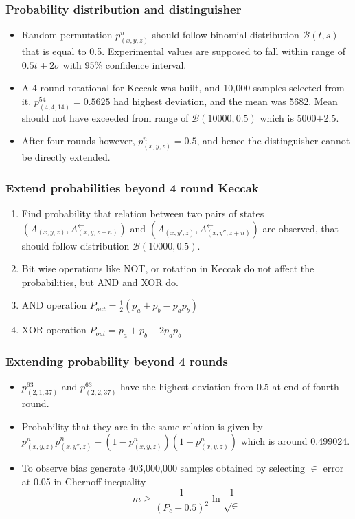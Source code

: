 \documentclass{beamer}
\begin{document}
\begin{frame}
\frametitle{Probability distribution and distinguisher}
\begin{itemize}
\item Random permutation $p^n_{(x, y, z)}$ should follow binomial distribution $\mathcal{B}(t, s)$ that is equal
to 0.5. Experimental values are supposed to fall within range of $0.5t\pm2\sigma$ with 95\% confidence interval.
\item A 4 round rotational for Keccak was built, and 10,000 samples selected from it. $p^{54}_{(4, 4, 14)} = 0.5625$
had highest deviation, and the mean was 5682. Mean should not have exceeded from range of 
$\mathcal{B}(10000, 0.5)$ which is 5000$\pm$2.5.
\item After four rounds however, $p^n_{(x, y, z)} = 0.5$, and hence the distinguisher cannot be directly extended.
\end{itemize}
\end{frame}

\begin{frame}
\frametitle{Extend probabilities beyond 4 round Keccak}
\begin{enumerate}
\item Find probability that relation between two pairs of states $(A_{(x, y, z)}, A^{\leftarrow}_{(x, y, z+n)})$ 
and $(A_{(x, y', z)}, A^{\leftarrow}_{(x, y'', z+n)})$ are observed, that should follow distribution 
$\mathcal{B}(10000, 0.5)$.
\item Bit wise operations like NOT, or rotation in Keccak do not affect the probabilities, but AND and XOR do.
\item AND operation $P_{out} = \frac{1}{2}(p_{a} + p_{b} - p_{a} p_{b})$ \footnotemark
\item XOR operation $P_{out} = p_{a} + p_{b} - 2 p_{a} p_{b}$
\end{enumerate}
\end{frame}

\begin{frame}
\frametitle{Extending probability beyond 4 rounds}
\begin{itemize}
\item $p^{63}_{(2, 1, 37)}$ and $p^{63}_{(2, 2, 37)}$ have the highest deviation from 0.5 at end of fourth round.
\item Probability that they are in the same relation is given by $p^n_{(x, y, z)} \dot p^n_{(x, y'', z)} + (1 - p^n_{(x, y, z)})
(1 - p^n_{(x, y, z)})$ which is around 0.499024.
\item To observe bias generate 403,000,000 samples obtained by selecting $\in$ error at 0.05 in Chernoff inequality \\
\[ m \geq \frac{1}{(P_c - 0.5)^2} \ln \frac{1}{\sqrt \in}\]
\end{itemize}
\end{frame}
\end{document}
